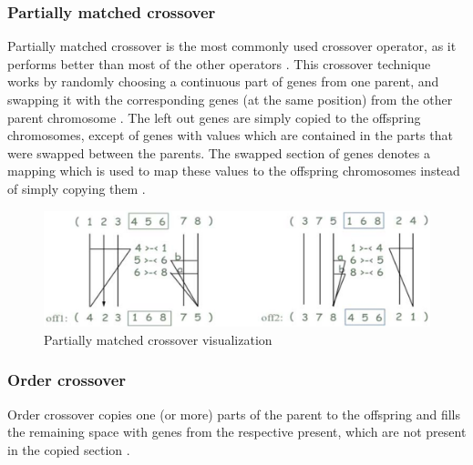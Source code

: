 \documentclass[sigconf]{acmart}
\begin{document}
\subsubsection{Partially matched crossover}
Partially matched crossover is the most commonly used crossover operator,
as it performs better than most of the other operators \cite{Katoch2021}.
This crossover technique works by randomly choosing a continuous part of genes
from one parent, and swapping it with the corresponding genes (at the same
position) from the other parent chromosome \cite{Katoch2021}.
The left out genes are simply copied to the offspring chromosomes, except of
genes with values which are contained in the parts that were swapped between
the parents. The swapped section of genes denotes a mapping which is used to
map these values to the offspring chromosomes instead of simply copying them
\cite{Katoch2021}.

\begin{figure}[h]
  \includegraphics[scale=0.14]{assets/partially-matched-crossover.png}
  \caption{Partially matched crossover visualization \cite{Katoch2021}}
\end{figure}


\subsubsection{Order crossover}
Order crossover copies one (or more) parts of the parent to the offspring
and fills the remaining space with genes from the respective present, which
are not present in the copied section \cite{Katoch2021}.


\end{document}

